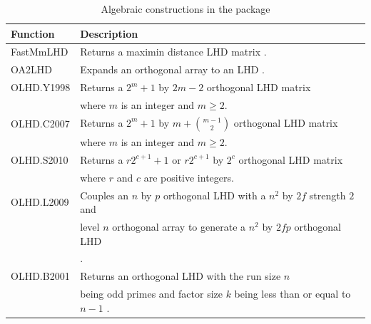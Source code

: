 \begin{table}[!htb]
	\caption{Algebraic constructions in the  package}\label{A2}
	\begin{center}
		\small \begin{tabular}{ll}
				\hline
				Function & Description\\
				\hline
				FastMmLHD & Returns a maximin distance LHD matrix  \citep{wang2018optimal}.\\

				OA2LHD & Expands an orthogonal array to an LHD  \citep{tang1993orthogonal}.\\

				OLHD.Y1998 & Returns a $2^m+1$ by $2m-2$ orthogonal LHD matrix \citep{ye1998orthogonal}   \\
				&  where $m$ is an integer and $m \geq 2$.\\

				OLHD.C2007 & Returns a $2^m+1$ by $m+{m-1 \choose 2}$ orthogonal LHD matrix  \\
				& \citep{cioppa2007efficient} where $m$ is an integer and $m \geq 2$.\\

				OLHD.S2010 & Returns a $r2^{c+1}+1$ or $r2^{c+1}$ by $2^c$ orthogonal LHD matrix  \\
				& \citep{sun2010construction} where $r$ and $c$ are positive integers.\\

				OLHD.L2009 & Couples an $n$ by $p$ orthogonal LHD with a $n^2$ by $2f$ strength $2$ and \\
				& level $n$ orthogonal array to generate a $n^2$ by $2fp$ orthogonal LHD \\
				&  \citep{lin2009construction}.\\

				OLHD.B2001 & Returns an orthogonal LHD  \citep{butler2001optimal} with the run size $n$\\
				&  being odd primes and factor size $k$ being less than or equal to $n-1$ .\\

				\hline
		\end{tabular}
	\end{center}
\end{table}


